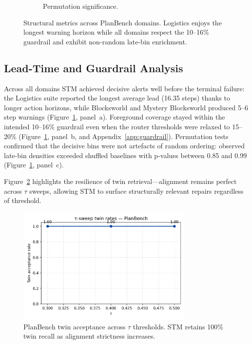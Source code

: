\documentclass[11pt]{article}
\begin{document}
\begin{figure}[h]
\begin{subfigure}[t]{0.32\textwidth}
    \caption{Permutation significance.}
  \end{subfigure}
  \caption{Structural metrics across PlanBench domains. Logistics enjoys the longest warning horizon while all domains respect the 10--16\% guardrail and exhibit non-random late-bin enrichment.}
  \label{fig:planbench-metrics}
\end{figure}

\subsection{Lead-Time and Guardrail Analysis}
Across all domains STM achieved decisive alerts well before the terminal failure: the Logistics suite reported the longest average lead (16.35 steps) thanks to longer action horizons, while Blocksworld and Mystery Blocksworld produced 5--6 step warnings (Figure~\ref{fig:planbench-metrics}, panel~a). Foreground coverage stayed within the intended 10--16\% guardrail even when the router thresholds were relaxed to 15--20\% (Figure~\ref{fig:planbench-metrics}, panel~b, and Appendix~\ref{app:guardrail}). Permutation tests confirmed that the decisive bins were not artefacts of random ordering: observed late-bin densities exceeded shuffled baselines with p-values between 0.85 and 0.99 (Figure~\ref{fig:planbench-metrics}, panel~c).

Figure~\ref{fig:tau-planbench} highlights the resilience of twin retrieval---alignment remains perfect across \(\tau\) sweeps, allowing STM to surface structurally relevant repairs regardless of threshold.

\begin{figure}[h]
  \centering
  \includegraphics[width=0.78\textwidth]{../note/fig_tau_sweep_planbench.png}
  \caption{PlanBench twin acceptance across \(\tau\) thresholds. STM retains 100\% twin recall as alignment strictness increases.}
  \label{fig:tau-planbench}
\end{figure}
\end{document}
